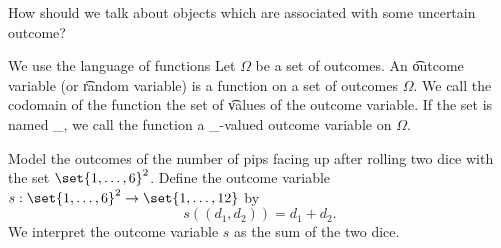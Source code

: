 

How should we talk about objects which are associated with some uncertain outcome?


We use the language of functions
Let $\Omega $ be a set of outcomes.
An \t{outcome variable} (or \t{random variable}) is a function on a set of outcomes $\Omega $.
We call the codomain of the function the set of \t{values} of the outcome variable.
If the set is named \_, we call the function a \_-valued outcome variable on $\Omega $.


Model the outcomes of the number of pips facing up after rolling two dice with the set $\set{1, \dots, 6}^2$.
Define the outcome variable $s: \set{1, \dots, 6}^2 \to \set{1, \dots, 12}$ by
  \[
s((d_1, d_2)) = d_1 + d_2.
  \]
We interpret the outcome variable $s$ as the sum of the two dice.

\blankpage
